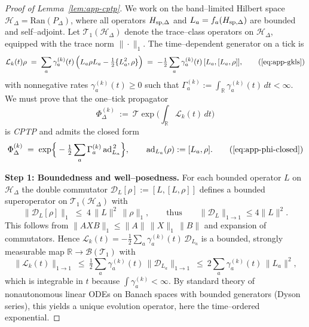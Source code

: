 \documentclass[10pt]{article}
\theoremstyle{definition}
\theoremstyle{plain}
\begin{document}
\begin{proof}[Proof of Lemma~\ref{lem:app-cptp}]
We work on the band–limited Hilbert space \(\mathcal H_\Delta=\mathrm{Ran}(P_\Delta)\), where all operators
\(H_{{\rm sp},\Delta}\) and \(L_a=f_a(H_{{\rm sp},\Delta})\) are bounded and self–adjoint. Let
\(\mathcal T_1(\mathcal H_\Delta)\) denote the trace–class operators on \(\mathcal H_\Delta\), equipped with
the trace norm \(\|\cdot\|_1\). The time–dependent generator on a tick is
\[
\mathcal L_k(t)\rho \;=\; \sum_a \gamma_a^{(k)}(t)\,\Big(L_a\rho L_a-\tfrac12\{L_a^2,\rho\}\Big)
\;=\;-\tfrac12\sum_a \gamma_a^{(k)}(t)\,[L_a,[L_a,\rho]],
\tag{\ref{eq:app-gkls}}
\]
with nonnegative rates \(\gamma_a^{(k)}(t)\ge 0\) such that \(\Gamma_a^{(k)}:=\int_{\mathbb R}\gamma_a^{(k)}(t)\,dt<\infty\).
We must prove that the one–tick propagator
\[
\Phi_\Delta^{(k)}\ :=\ \mathcal T\exp\!\Big(\int_{\mathbb R}\!\mathcal L_k(t)\,dt\Big)
\]
is \emph{CPTP} and admits the closed form
\[
\Phi_\Delta^{(k)}\;=\;\exp\!\Big\{-\tfrac12\sum_a \Gamma_a^{(k)}\,\mathrm{ad}_{L_a}^{\,2}\Big\},
\qquad \mathrm{ad}_{L_a}(\rho):=[L_a,\rho].
\tag{\ref{eq:app-phi-closed}}
\]

\medskip
\noindent\textbf{Step 1: Boundedness and well–posedness.}
For each bounded operator \(L\) on \(\mathcal H_\Delta\) the double commutator
\(\mathcal D_L[\rho]:=[L,[L,\rho]]\) defines a bounded superoperator on \(\mathcal T_1(\mathcal H_\Delta)\) with
\begin{equation}
\|\mathcal D_L[\rho]\|_1 \;\le\; 4\,\|L\|^2\,\|\rho\|_1,
\qquad\text{thus}\qquad \|\mathcal D_L\|_{1\to 1}\le 4\|L\|^2.
\label{eq:DO-bound-app}
\end{equation}
This follows from \(\|AXB\|_1\le \|A\|\,\|X\|_1\,\|B\|\) and expansion of commutators.
Hence \(\mathcal L_k(t)=-\tfrac12\sum_a \gamma_a^{(k)}(t)\,\mathcal D_{L_a}\) is a bounded, strongly
measurable map \(\mathbb R\to\mathcal B(\mathcal T_1)\) with
\[
\|\mathcal L_k(t)\|_{1\to 1}\ \le\ \tfrac12\sum_a \gamma_a^{(k)}(t)\,\|\mathcal D_{L_a}\|_{1\to 1}
\ \le\ 2\sum_a \gamma_a^{(k)}(t)\,\|L_a\|^2,
\]
which is integrable in \(t\) because \(\int \gamma_a^{(k)}<\infty\).
By standard theory of nonautonomous linear ODEs on Banach spaces with bounded
generators (Dyson series), this yields a unique evolution operator, here the time–ordered exponential.


\end{proof}
\end{document}
